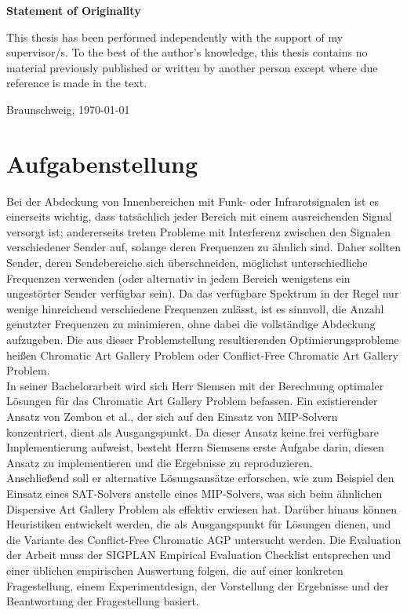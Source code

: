 \documentclass[11pt,a4paper,twoside,titlepage]{scrbook}
\theoremstyle{thmstyleone}%
\theoremstyle{thmstyletwo}%
\theoremstyle{thmstylethree}%
\begin{document}
	\cleardoublepage
	
	\thispagestyle{plain} %
	\vspace*{7cm}
	\centerline{\bfseries Statement of Originality}
	\vspace*{1em}
	\noindent
	This thesis has been performed independently with the support of my supervisor/s.
	To the best of the author's knowledge, this thesis contains no material previously
	published or written by another person except where due reference is made in the text.
	
	\par
	\bigskip\noindent Braunschweig, \today \par
	\vspace*{10mm}
	\hfill\hrulefill
	\cleardoublepage
	
	
	\chapter*{Aufgabenstellung}
	Bei der Abdeckung von Innenbereichen mit Funk- oder Infrarotsignalen ist es einerseits wichtig, dass tatsächlich jeder Bereich mit einem ausreichenden Signal versorgt ist; andererseits treten Probleme mit Interferenz zwischen den Signalen verschiedener Sender auf, solange deren Frequenzen zu ähnlich sind. Daher sollten Sender, deren Sendebereiche sich überschneiden, möglichst unterschiedliche Frequenzen verwenden (oder alternativ in jedem Bereich wenigstens ein ungestörter Sender verfügbar sein). Da das verfügbare Spektrum in der Regel nur wenige hinreichend verschiedene Frequenzen zulässt, ist es sinnvoll, die Anzahl genutzter Frequenzen zu minimieren, ohne dabei die vollständige Abdeckung aufzugeben. Die aus dieser Problemstellung resultierenden Optimierungsprobleme heißen Chromatic Art Gallery Problem oder Conflict-Free Chromatic Art Gallery Problem. \\
    In seiner Bachelorarbeit wird sich Herr Siemsen mit der Berechnung optimaler Lösungen für das Chromatic Art Gallery Problem befassen.
    Ein existierender Ansatz von Zembon et al., der sich auf den Einsatz von MIP-Solvern konzentriert, dient als Ausgangspunkt.
    Da dieser Ansatz keine frei verfügbare Implementierung aufweist, besteht Herrn Siemsens erste Aufgabe darin, diesen Ansatz zu implementieren und die Ergebnisse zu reproduzieren. \\
    Anschließend soll er alternative Lösungsansätze erforschen, wie zum Beispiel den Einsatz eines SAT-Solvers anstelle eines MIP-Solvers, was sich beim ähnlichen Dispersive Art Gallery Problem als effektiv erwiesen hat.
    Darüber hinaus können Heuristiken entwickelt werden, die als Ausgangspunkt für Lösungen dienen, und die Variante des Conflict-Free Chromatic AGP untersucht werden.
    Die Evaluation der Arbeit muss der SIGPLAN Empirical Evaluation Checklist entsprechen und einer üblichen empirischen Auswertung folgen,
    die auf einer konkreten Fragestellung, einem Experimentdesign, der Vorstellung der Ergebnisse und der Beantwortung der Fragestellung basiert.
	
\end{document}
